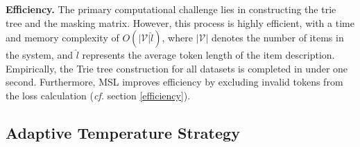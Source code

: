 \documentclass[sigconf,natbib=true]{acmart}
\newcommand{\cf}{\emph{cf. }}
\begin{document}

\textbf{Efficiency.} The primary computational challenge lies in constructing the trie tree and the masking matrix. However, this process is highly efficient, with a time and memory complexity of \(O(|\mathcal{V}|\hat{l})\), where \(|\mathcal{V}|\) denotes the number of items in the system, and \(\hat{l}\) represents the average token length of the item description. Empirically, the Trie tree construction for all datasets is completed in under one second. Furthermore, MSL improves efficiency by excluding invalid tokens from the loss calculation (\cf section \ref{efficiency}).

\subsection{Adaptive Temperature Strategy}
\label{sec:ATS}
\end{document}
